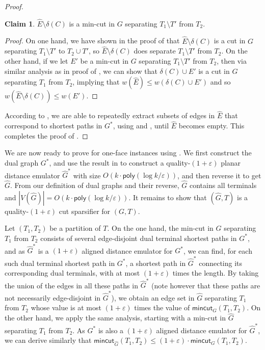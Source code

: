 \documentclass[11pt]{article}
\theoremstyle{definition}
\newtheorem{claim}[theorem]{Claim}
\newcommand{\eps}{{\varepsilon}}
\newcommand{\poly}{\mathsf{poly}}
\newcounter{note}
\newcommand{\mc}{\mathsf{mincut}}
\begin{document}
\begin{proof}
	\begin{claim}
		\label{clm: recursive}
		$\hat E\setminus \delta(C)$ is a min-cut in $G$ separating $T_1\setminus T'$ from $T_2$.
	\end{claim}
	\begin{proof}
		On one hand, we have shown in the proof of  that $\hat E\setminus \delta(C)$ is a cut in $G$ separating $T_1\setminus T'$ to $T_2\cup T'$, so $\hat E\setminus \delta(C)$ does separate $T_1\setminus T'$ from $T_2$.
On the other hand, if we let $E'$ be a min-cut in $G$ separating $T_1\setminus T'$ from $T_2$, then via similar analysis as in proof of , we can show that $\delta(C)\cup E'$ is a cut in $G$ separating $T_1$ from $T_2$, implying that $w(\hat E)\le w(\delta(C)\cup E')$ and so $w(\hat E\setminus \delta(C))\le w(E')$.
	\end{proof}
	According to , we are able to repeatedly extract subsets of edges in $\hat E$ that correspond to shortest paths in $G^*$, using  and , until $\hat E$ becomes empty. This completes the proof of . 
\end{proof}


We are now ready to prove  for one-face instances using .
We first construct the dual graph $G^*$, and use the result in \cite{chang2022near} to construct a quality-$(1+\eps)$ planar distance emulator $\hat G^*$ with size $O(k\cdot \poly(\log k/\eps))$, and then reverse it to get $\hat G$. 
From our definition of dual graphs and their reverse, $\hat G$ contains all terminals and $|V(\hat G)|=O(k\cdot \poly(\log k/\eps))$. It remains to show that $(\hat G,T)$ is a quality-$(1+\eps)$ cut sparsifier for $(G,T)$. 

Let $(T_1,T_2)$ be a partition of $T$.
On the one hand, the min-cut in $G$ separating $T_1$ from $T_2$ consists of several edge-disjoint dual terminal shortest paths in $G^*$, and as $\hat G^*$ is a $(1+\eps)$ aligned distance emulator for $G^*$, we can find, for each such dual terminal shortest path in $G^*$, a shortest path in $\hat G^*$ connecting its corresponding dual terminals, with at most $(1+\eps)$ times the length. By taking the union of the edges in all these paths in $\hat G^*$ (note however that these paths are not necessarily edge-disjoint in $\hat G^*$), we obtain an edge set in $\hat G$ separating $T_1$ from $T_2$ whose value is at most $(1+\eps)$ times the value of $\mc_G(T_1,T_2)$. 
On the other hand, we apply the same analysis, starting with a min-cut in $\hat G$ separating $T_1$ from $T_2$. As $G^*$ is also a $(1+\eps)$ aligned distance emulator for $\hat G^*$, we can derive similarly that $\mc_{\hat G}(T_1,T_2)\le (1+\eps)\cdot \mc_G(T_1,T_2)$.
\end{document}
